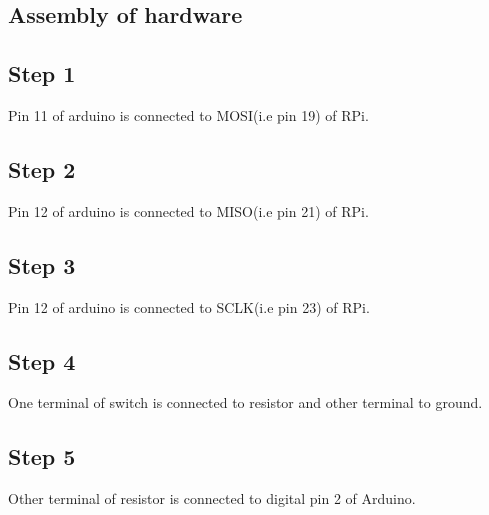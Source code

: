 \documentclass[a4paper,12pt,oneside]{book}
\begin{document}
\subsection*{Assembly of hardware}
\subsection*{Step 1}
Pin 11 of arduino is connected to MOSI(i.e pin 19) of RPi.
\subsection*{Step 2}
Pin 12 of arduino is connected to MISO(i.e pin 21) of RPi.
\subsection*{Step 3}
Pin 12 of arduino is connected to SCLK(i.e pin 23) of RPi.
\subsection*{Step 4}
One terminal of switch is connected to resistor and other terminal to ground.
\subsection*{Step 5}
Other terminal of resistor is connected to digital pin 2 of Arduino.
\end{document}
